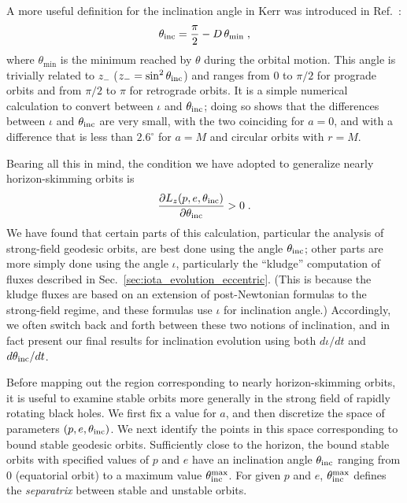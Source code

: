 \documentclass[aps,prd,twocolumn,showpacs,groupedaddress,nofootinbib]{revtex4}
\newcommand{\eq}{\begin{equation}}
\newcommand{\eeq}{\end{equation}}
\begin{document}
A more useful definition for the inclination angle in Kerr was
introduced in Ref.~\cite{hughes_drasco}:
\eq
\theta_{\rm inc} = \frac{\pi}{2}-D\,\theta_{\min}\;,
\eeq
where $\theta_{\min}$ is the minimum reached by $\theta$ during the
orbital motion.  This angle is trivially related to $z_{-}$
($z_{-}=\sin^2\theta_{\rm inc}$) and ranges from $0$ to $\pi/2$ for
prograde orbits and from $\pi/2$ to $\pi$ for retrograde orbits.  It
is a simple numerical calculation to convert between $\iota$ and
$\theta_{\rm inc}$; doing so shows that the differences between
$\iota$ and $\theta_{\rm inc}$ are very small, with the two coinciding
for $a=0$, and with a difference that is less than $2.6^\circ$ for
$a=M$ and circular orbits with $r=M$.

Bearing all this in mind, the condition we have adopted to generalize
nearly horizon-skimming orbits is
\eq
\frac{\partial L_z(p,e,\theta_{\rm inc})}{\partial\theta_{\rm inc}}>0\;.
\eeq
We have found that certain parts of this calculation, particular the
analysis of strong-field geodesic orbits, are best done using the
angle $\theta_{\rm inc}$; other parts are more simply done using the
angle $\iota$, particularly the ``kludge'' computation of fluxes
described in Sec.\ {\ref{sec:iota_evolution_eccentric}}.  (This is
because the kludge fluxes are based on an extension of post-Newtonian
formulas to the strong-field regime, and these formulas use $\iota$
for inclination angle.)  Accordingly, we often switch back and forth
between these two notions of inclination, and in fact present our
final results for inclination evolution using both $d\iota/dt$ and
$d\theta_{\rm inc}/dt$.

Before mapping out the region corresponding to nearly horizon-skimming
orbits, it is useful to examine stable orbits more generally in the
strong field of rapidly rotating black holes.  We first fix a value
for $a$, and then discretize the space of parameters $(p,e,\theta_{\rm
inc})$.  We next identify the points in this space corresponding to
bound stable geodesic orbits.  Sufficiently close to the horizon, the
bound stable orbits with specified values of $p$ and $e$ have an
inclination angle $\theta_{\rm inc}$ ranging from $0$ (equatorial
orbit) to a maximum value $\theta_{\rm inc}^{\rm max}$.  For given $p$
and $e$, $\theta_{\rm inc}^{\rm max}$ defines the {\it separatrix}
between stable and unstable orbits.
\end{document}
